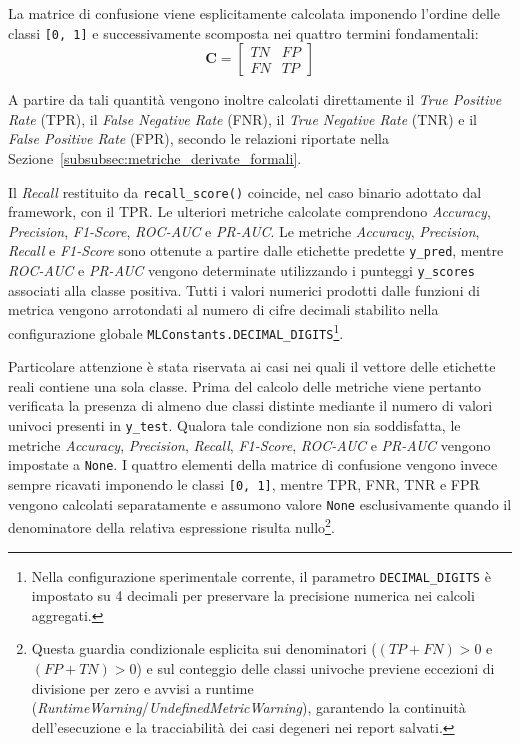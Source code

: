 La matrice di confusione viene esplicitamente calcolata imponendo l'ordine delle classi \texttt{[0, 1]} e successivamente scomposta nei quattro termini fondamentali:
\begin{equation}
\mathbf{C} =
\begin{bmatrix}
TN & FP \\
FN & TP
\end{bmatrix}
\label{eq:confusion_matrix_implementation}
\end{equation}

A partire da tali quantità vengono inoltre calcolati direttamente il \textit{True Positive Rate} (TPR), il \textit{False Negative Rate} (FNR), il \textit{True Negative Rate} (TNR) e il \textit{False Positive Rate} (FPR), secondo le relazioni riportate nella Sezione~\ref{subsubsec:metriche_derivate_formali}.

Il \textit{Recall} restituito da \texttt{recall\_score()} coincide, nel caso binario adottato dal framework, con il TPR. 
Le ulteriori metriche calcolate comprendono \textit{Accuracy}, \textit{Precision}, \textit{F1-Score}, \textit{ROC-AUC} e \textit{PR-AUC}. Le metriche \textit{Accuracy}, \textit{Precision}, \textit{Recall} e \textit{F1-Score} sono ottenute a partire dalle etichette predette \texttt{y\_pred}, mentre \textit{ROC-AUC} e \textit{PR-AUC} vengono determinate utilizzando i punteggi \texttt{y\_scores} associati alla classe positiva. 
Tutti i valori numerici prodotti dalle funzioni di metrica vengono arrotondati al numero di cifre decimali stabilito nella configurazione globale \texttt{MLConstants.DECIMAL\_DIGITS}\footnote{Nella configurazione sperimentale corrente, il parametro \texttt{DECIMAL\_DIGITS} è impostato su 4 decimali per preservare la precisione numerica nei calcoli aggregati.}.

Particolare attenzione è stata riservata ai casi nei quali il vettore delle etichette reali contiene una sola classe. 
Prima del calcolo delle metriche viene pertanto verificata la presenza di almeno due classi distinte mediante il numero di valori univoci presenti in \texttt{y\_test}. 
Qualora tale condizione non sia soddisfatta, le metriche \textit{Accuracy}, \textit{Precision}, \textit{Recall}, \textit{F1-Score}, \textit{ROC-AUC} e \textit{PR-AUC} vengono impostate a \texttt{None}. 
I quattro elementi della matrice di confusione vengono invece sempre ricavati imponendo le classi \texttt{[0, 1]}, mentre TPR, FNR, TNR e FPR vengono calcolati separatamente e assumono valore \texttt{None} esclusivamente quando il denominatore della relativa espressione risulta nullo\footnote{Questa guardia condizionale esplicita sui denominatori ($(TP + FN) > 0$ e $(FP + TN) > 0$) e sul conteggio delle classi univoche previene eccezioni di divisione per zero e avvisi a runtime (\textit{RuntimeWarning}/\textit{UndefinedMetricWarning}), garantendo la continuità dell'esecuzione e la tracciabilità dei casi degeneri nei report salvati.}. 

